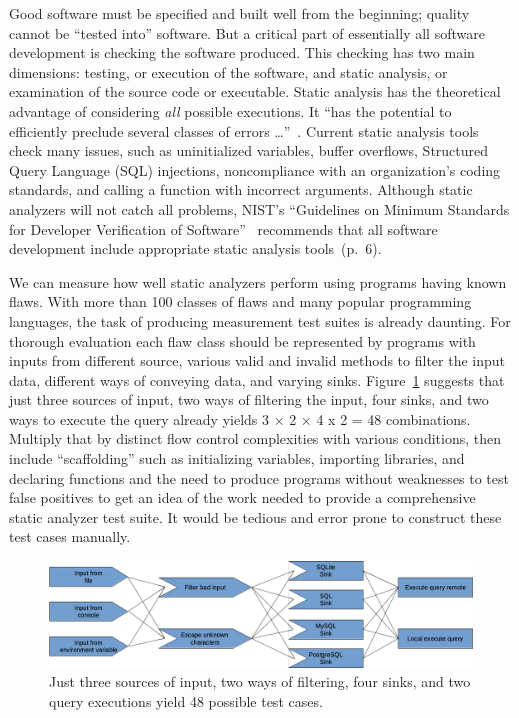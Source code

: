 Good software must be specified and built well from the beginning; quality cannot be
``tested into'' software.  But a critical part of essentially all software
development is checking the software produced.  This checking has two main
dimensions: testing, or execution of the software, and static analysis, or
examination of the source code or executable.  Static analysis has the theoretical
advantage of considering \emph{all} possible executions.  It ``has the potential to
efficiently preclude several classes of errors \ldots''~\cite[p.~7]{DRSV2016}.
Current static analysis tools check many issues, such as uninitialized variables,
buffer overflows, Structured Query Language (SQL) injections,
noncompliance with an organization’s coding
standards, and calling a function with incorrect arguments.  Although static
analyzers will not catch all problems, NIST's ``Guidelines on Minimum Standards
for Developer Verification of Software''~\cite{MinGuidelines2021} recommends
that all software development include appropriate static analysis tools~(p.~6).

We can measure how well static analyzers perform using programs having known
flaws.  With more than 100 classes of flaws and many popular programming
languages, the task of producing measurement test suites is already daunting.
For thorough evaluation each flaw class should be represented by programs with
inputs from different source, various valid and invalid methods to filter the
input data, different ways of conveying data, and varying sinks.
Figure~\ref{fig:cartesian product} suggests that just three sources of input,
two ways of filtering the input, four sinks, and two ways to execute the query
already yields 3 × 2 × 4 x 2 = 48
combinations.  Multiply that by distinct flow control
complexities with various conditions, then include ``scaffolding'' such as
initializing variables, importing libraries, and declaring functions and the
need to produce programs without weaknesses to test false positives to get an
idea of the work needed to provide a comprehensive static analyzer test suite.
It would be tedious and error prone to construct these test cases
manually.

\begin{figure}[tbp]
  \includegraphics[width=1\linewidth]{fig_cartesian_product.png}
  \caption{Just three sources of input, two ways of filtering, four sinks, and
    two query executions yield 48 possible test cases.}
  \label{fig:cartesian product}
\end{figure}

